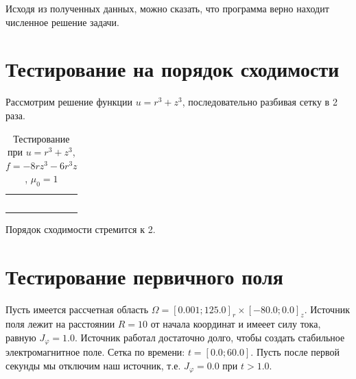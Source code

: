 Исходя из полученных данных, можно сказать, что программа верно находит численное решение задачи.

\section{Тестирование на порядок сходимости}

Рассмотрим решение функции $u = r^3 + z^3$, последовательно разбивая сетку в 2 раза. 

\begin{table}
	\caption{Тестирование при $u = r^3 + z^3$, $f = -8rz^3 - 6r^3 z$, $\mu_0 = 1$}
	\centering
	\small
	\begin{tabularx}{1.0\textwidth}{| >{\raggedright\arraybackslash}X | >{\raggedright\arraybackslash}X | >{\raggedright\arraybackslash}X |>{\raggedright\arraybackslash}X |}
		\hline
		\centering{Количество разбиений} & \centering{Средняя погрешность} & \centering{Порядок сходимости} \tabularnewline \hline		
		
		\centering{2} & \centering{1.7116567E-004}& \centering{-} \tabularnewline \hline
		
		\centering{4} & \centering{5.2066366E-005} & \centering{1.716969754} \tabularnewline \hline
		
		\centering{8} & \centering{1.4089198E-005} & \centering{1.885762274} \tabularnewline \hline
		
		\centering{16} & \centering{3.6602112E-006} & \centering{1.94459064} \tabularnewline \hline
		
		\centering{32} & \centering{9.3301457E-007} & \centering{1.971955381} \tabularnewline \hline
		
	\end{tabularx}
	\label{tab:test11}
\end{table}

Порядок сходимости стремится к 2.

\section{Тестирование первичного поля}

Пусть имеется рассчетная область $\Omega = [0.001; 125.0]_r \times [-80.0; 0.0]_z$. Источник поля лежит на расстоянии $R = 10$ от начала координат и имееет силу тока, равную $J_{\varphi} = 1.0$. Источник работал достаточно долго, чтобы создать стабильное электромагнитное поле. Сетка по времени: $t=[0.0; 60.0]$. Пусть после первой секунды мы отключим наш источник, т.е. $J_{\varphi} = 0.0$ при $t > 1.0$.

